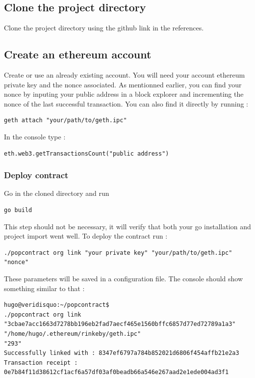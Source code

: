 \documentclass[11pt, a4paper, twoside, openright]{book} %
\begin{document}
\subsection*{Clone the project directory}
Clone the project directory using the github link in the references.
\subsection*{Create an ethereum account}
Create or use an already existing account. You will need your account ethereum private key and the nonce associated. As mentionned earlier, you can find your nonce by inputing your public address in a block explorer and incrementing the nonce of the last successful transaction. You can also find it directly by running :
\begin{verbatim}
geth attach "your/path/to/geth.ipc"
\end{verbatim}
In the console type :
\begin{verbatim}
eth.web3.getTransactionsCount("public address")
\end{verbatim}
\subsubsection*{Deploy contract}
Go in the cloned directory and run
\begin{verbatim}
go build
\end{verbatim}
This step should not be necessary, it will verify that both your go installation and project import went well.
To deploy the contract run :
\begin{verbatim}
./popcontract org link "your private key" "your/path/to/geth.ipc" "nonce"
\end{verbatim}
These parameters will be saved in a configuration file.
The console should show something similar to that :
\begin{verbatim}
hugo@veridisquo:~/popcontract$
./popcontract org link
"3cbae7acc1663d7278bb196eb2fad7aecf465e1560bffc6857d77ed72789a1a3"
"/home/hugo/.ethereum/rinkeby/geth.ipc"
"293"
Successfully linked with : 8347ef6797a784b852021d6806f454affb21e2a3
Transaction receipt :
0e7b84f11d38612cf1acf6a57df03af0beadb66a546e267aad2e1ede004ad3f1
\end{verbatim}
\end{document}
